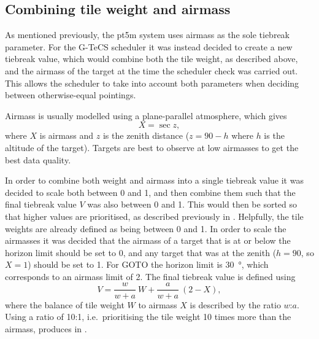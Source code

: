 \subsection{Combining tile weight and airmass}
\label{sec:wa}
\begin{colsection}

As mentioned previously, the pt5m system uses airmass as the sole tiebreak parameter. For the G-TeCS scheduler it was instead decided to create a new tiebreak value, which would combine both the tile weight, as described above, and the airmass of the target at the time the scheduler check was carried out. This allows the scheduler to take into account both parameters when deciding between otherwise-equal pointings.

Airmass is usually modelled using a plane-parallel atmosphere, which gives
%
\begin{equation}
    X = \sec{z},
    \label{eq:airmass}
\end{equation}
%
where $X$ is airmass and $z$ is the zenith distance ($z=90-h$ where $h$ is the altitude of the target). Targets are best to observe at low airmasses to get the best data quality.

In order to combine both weight and airmass into a single tiebreak value it was decided to scale both between 0 and 1, and then combine them such that the final tiebreak value $V$ was also between 0 and 1. This would then be sorted so that higher values are prioritised, as described previously in . Helpfully, the tile weights are already defined as being between 0 and 1. In order to scale the airmasses it was decided that the airmass of a target that is at or below the horizon limit should be set to 0, and any target that was at the zenith ($h=90$, so $X=1$) should be set to 1. For GOTO the horizon limit is \SI{30}{\degree}, which corresponds to an airmass limit of 2. The final tiebreak value is defined using
%
\begin{equation}
    V = \frac{w}{w+a}~W + \frac{a}{w+a}~(2-X),
    \label{eq:wa_ratio}
\end{equation}
%
where the balance of tile weight $W$ to airmass $X$ is described by the ratio $w$:$a$. Using a ratio of 10:1, i.e.\ prioritising the tile weight 10 times more than the airmass, produces  in .

\newpage

\end{colsection}

